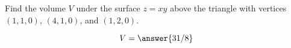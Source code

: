 \documentclass{ximera}
\author{David Guichard \and Neal Koblitz \and H. Jerome Keisler \and Albert Scheller \and Barry Balof \and Mike Wills \and Matthew Carr}
\begin{document}
\begin{exercise}




Find the volume $V$ under the surface $z=xy$ above the triangle with vertices $(1,1,0)$, $(4,1,0)$, and $(1,2,0)$.

\begin{prompt}
\[
V=\answer{31/8}
\]
\end{prompt}



\end{exercise}
\end{document}
